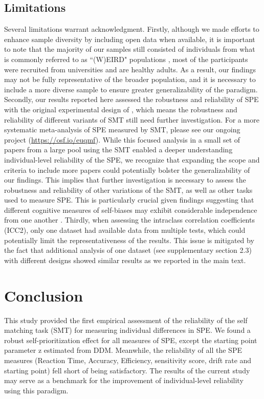 \documentclass[sn-apa]{sn-jnl}%
\theoremstyle{thmstyleone}%
\theoremstyle{thmstyletwo}%
\theoremstyle{thmstylethree}%
\begin{document}
\subsection{Limitations}\label{subsec:lim}
Several limitations warrant acknowledgment. Firstly, although we made efforts to enhance sample diversity by including open data when available, it is important to note that the majority of our samples still consisted of individuals from what is commonly referred to as ``(W)EIRD" populations \parencite{rad2018toward,yue2023weird}, most of the participants were recruited from universities and are healthy adults. As a result, our findings may not be fully representative of the broader population, and it is necessary to include a more diverse sample to ensure greater generalizability of the paradigm. Secondly, our results reported here assessed the robustness and reliability of SPE with the original experimental design of \textcite{sui2012perceptual}, which means the robustness and reliability of different variants of SMT still need further investigation. For a more systematic meta-analysis of SPE measured by SMT, please see our ongoing project (\url{https://osf.io/euqmf}). While this focused analysis in a small set of papers from a large pool using the SMT enabled a deeper understanding individual-level reliability of the SPE, we recognize that expanding the scope and criteria to include more papers could potentially bolster the generalizability of our findings. This implies that further investigation is necessary to assess the robustness and reliability of other variations of the SMT, as well as other tasks used to measure SPE. This is particularly crucial given findings suggesting that different cognitive measures of self-biases may exhibit considerable independence from one another \parencite{nijhof2020no}. Thirdly, when assessing the intraclass correlation coefficients (ICC2), only one dataset had available data from multiple tests, which could potentially limit the representativeness of the results. This issue is mitigated by the fact that additional analysis of one dataset (see supplementary section 2.3) with different designs showed similar results as we reported in the main text. 

\section{Conclusion}\label{sec13}

This study provided the first empirical assessment of the reliability of the self matching task (SMT) for measuring individual differences in SPE. We found a robust self-prioritization effect for all measures of SPE, except the starting point parameter z estimated from DDM. Meanwhile, the reliability of all the SPE measures (Reaction Time, Accuracy, Efficiency, sensitivity score, drift rate and starting point) fell short of being satisfactory. The results of the current study may serve as a benchmark for the improvement of individual-level reliability using this paradigm. 
\end{document}
